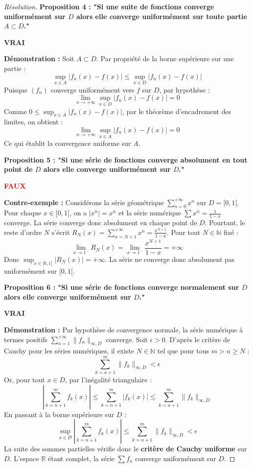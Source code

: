 \documentclass[12pt,a4paper]{report}
\begin{document}
\begin{proof}[Résolution]
\vspace{0.3cm}
\textbf{Proposition 4 : "Si une suite de fonctions converge uniformément sur $D$ alors elle converge uniformément sur toute partie $A \subset D$."}
\begin{center}
\textbf{\textcolor{blue!80!black}{VRAI}}
\end{center}
\textbf{Démonstration :} Soit $A \subset D$. Par propriété de la borne supérieure sur une partie :
\[ \sup_{x \in A} |f_n(x) - f(x)| \le \sup_{x \in D} |f_n(x) - f(x)| \]
Puisque $(f_n)$ converge uniformément vers $f$ sur $D$, par hypothèse :
\[ \lim_{n \to +\infty} \sup_{x \in D} |f_n(x) - f(x)| = 0 \]
Comme $0 \le \sup_{x \in A} |f_n(x) - f(x)|$, par le théorème d'encadrement des limites, on obtient :
\[ \lim_{n \to +\infty} \sup_{x \in A} |f_n(x) - f(x)| = 0 \]
Ce qui établit la convergence uniforme sur $A$.

\vspace{0.3cm}
\textbf{Proposition 5 : "Si une série de fonctions converge absolument en tout point de $D$ alors elle converge uniformément sur $D$."}
\begin{center}
\textbf{\textcolor{red}{FAUX}}
\end{center}
\textbf{Contre-exemple :} Considérons la série géométrique $\sum_{n=0}^{+\infty} x^n$ sur $D = [0, 1[$.
Pour chaque $x \in [0, 1[$, on a $|x^n| = x^n$ et la série numérique $\sum x^n = \frac{1}{1-x}$ converge. La série converge donc absolument en chaque point de $D$.
Pourtant, le reste d'ordre $N$ s'écrit $R_N(x) = \sum_{n=N+1}^{+\infty} x^n = \frac{x^{N+1}}{1-x}$.
Pour tout $N \in \mathbb{N}$ fixé :
\[ \lim_{x \to 1^-} R_N(x) = \lim_{x \to 1^-} \frac{x^{N+1}}{1-x} = +\infty \]
Donc $\sup_{x \in [0, 1[} |R_N(x)| = +\infty$. La série ne converge donc absolument pas uniformément sur $[0, 1[$.

\vspace{0.3cm}
\textbf{Proposition 6 : "Si une série de fonctions converge normalement sur $D$ alors elle converge uniformément sur $D$."}
\begin{center}
\textbf{\textcolor{blue!80!black}{VRAI}}
\end{center}
\textbf{Démonstration :} Par hypothèse de convergence normale, la série numérique à termes positifs $\sum_{n=1}^{+\infty} \|f_n\|_{\infty, D}$ converge.
Soit $\epsilon > 0$. D'après le critère de Cauchy pour les séries numériques, il existe $N \in \mathbb{N}$ tel que pour tous $m > n \ge N$ :
\[ \sum_{k=n+1}^m \|f_k\|_{\infty, D} < \epsilon \]
Or, pour tout $x \in D$, par l'inégalité triangulaire :
\[ \left| \sum_{k=n+1}^m f_k(x) \right| \le \sum_{k=n+1}^m |f_k(x)| \le \sum_{k=n+1}^m \|f_k\|_{\infty, D} \]
En passant à la borne supérieure sur $D$ :
\[ \sup_{x \in D} \left| \sum_{k=n+1}^m f_k(x) \right| \le \sum_{k=n+1}^m \|f_k\|_{\infty, D} < \epsilon \]
La suite des sommes partielles vérifie donc le \textbf{critère de Cauchy uniforme} sur $D$.
L'espace $\mathbb{R}$ étant complet, la série $\sum f_n$ converge uniformément sur $D$.


\end{proof}
\end{document}

